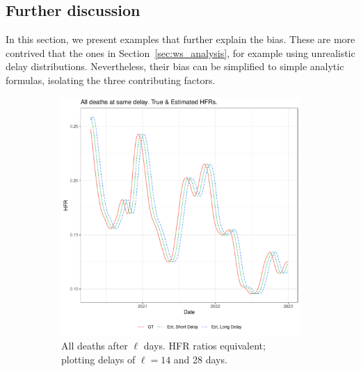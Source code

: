 \documentclass{article}
\begin{document}
\subsection{Further discussion}\label{apx:analysis}
In this section, we present examples that further explain the bias. These are more contrived that the ones in Section~\ref{sec:ws_analysis}, for example using unrealistic delay distributions. Nevertheless, their bias can be simplified to simple analytic formulas, isolating the three contributing factors.

\begin{figure}
     \centering
     \begin{subfigure}[b]{0.45\linewidth}
         \centering
         \includegraphics[width=\linewidth]{Figs/Simulated/sim_onehot.pdf}
         \caption{All deaths after $\ell$ days. HFR ratios equivalent; plotting delays of $\ell=14$ and 28 days.}
         \label{fig:onehot}
     \end{subfigure}
     \hfill
     \begin{subfigure}[b]{0.45\linewidth}
         \centering

\end{subfigure}
\end{figure}
\end{document}
